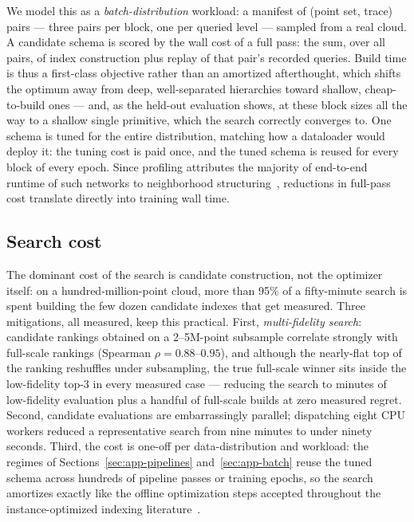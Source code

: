 We model this as a \emph{batch-distribution} workload: a manifest of (point set, trace) pairs --- three pairs per block, one per queried level --- sampled from a real cloud. A candidate schema is scored by the wall cost of a full pass: the sum, over all pairs, of index construction plus replay of that pair's recorded queries. Build time is thus a first-class objective rather than an amortized afterthought, which shifts the optimum away from deep, well-separated hierarchies toward shallow, cheap-to-build ones --- and, as the held-out evaluation shows, at these block sizes all the way to a shallow single primitive, which the search correctly converges to. One schema is tuned for the entire distribution, matching how a dataloader would deploy it: the tuning cost is paid once, and the tuned schema is reused for every block of every epoch. Since profiling attributes the majority of end-to-end runtime of such networks to neighborhood structuring~\cite{li2022psnet}, reductions in full-pass cost translate directly into training wall time.

\subsection{Search cost}
\label{sec:app-search-cost}

The dominant cost of the search is candidate construction, not the optimizer itself: on a hundred-million-point cloud, more than 95\% of a fifty-minute search is spent building the few dozen candidate indexes that get measured. Three mitigations, all measured, keep this practical. First, \emph{multi-fidelity search}: candidate rankings obtained on a 2--5M-point subsample correlate strongly with full-scale rankings (Spearman $\rho = 0.88$--$0.95$), and although the nearly-flat top of the ranking reshuffles under subsampling, the true full-scale winner sits inside the low-fidelity top-3 in every measured case --- reducing the search to minutes of low-fidelity evaluation plus a handful of full-scale builds at zero measured regret. Second, candidate evaluations are embarrassingly parallel; dispatching eight CPU workers reduced a representative search from nine minutes to under ninety seconds. Third, the cost is one-off per data-distribution and workload: the regimes of Sections~\ref{sec:app-pipelines} and~\ref{sec:app-batch} reuse the tuned schema across hundreds of pipeline passes or training epochs, so the search amortizes exactly like the offline optimization steps accepted throughout the instance-optimized indexing literature~\cite{nathan2020flood,ding2020tsunami}.

